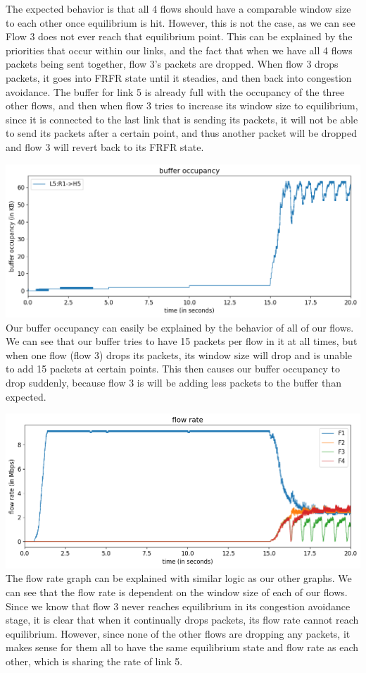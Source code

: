 \documentclass{article}
\begin{document}
The expected behavior is that all 4 flows should have a comparable window size to each other once equilibrium is hit. However, this is not the case, as we can see Flow 3 does not ever reach that equilibrium point. This can be explained by the priorities that occur within our links, and the fact that when we have all 4 flows packets being sent together, flow 3's packets are dropped. When flow 3 drops packets, it goes into FRFR state until it steadies, and then back into congestion avoidance. The buffer for link 5 is already full with the occupancy of the three other flows, and then when flow 3 tries to increase its window size to equilibrium, since it is connected to the last link that is sending its packets, it will not be able to send its packets after a certain point, and thus another packet will be dropped and flow 3 will revert back to its FRFR state. 

\includegraphics[width = \textwidth]{"test_case5_fast buffer occupancy"}
Our buffer occupancy can easily be explained by the behavior of all of our flows. We can see that our buffer tries to have 15 packets per flow in it at all times, but when one flow (flow 3) drops its packets, its window size will drop and is unable to add 15 packets at certain points. This then causes our buffer occupancy to drop suddenly, because flow 3 is will be adding less packets to the buffer than expected.


\includegraphics[width = \textwidth]{"test_case5_fast flow rate"}
The flow rate graph can be explained with similar logic as our other graphs. We can see that the flow rate is dependent on the window size of each of our flows. Since we know that flow 3 never reaches equilibrium in its congestion avoidance stage, it is clear that when it continually drops packets, its flow rate cannot reach equilibrium. However, since none of the other flows are dropping any packets, it makes sense for them all to have the same equilibrium state and flow rate as each other, which is sharing the rate of link 5.
\end{document}
